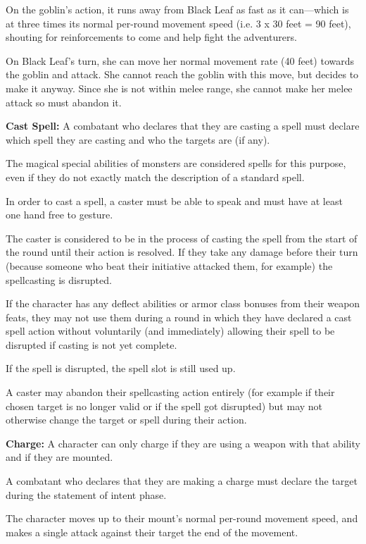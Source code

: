 \begin{multicols*}{2}
{On the goblin’s action, it runs away from Black Leaf as fast as it can—which is at three times its normal per-round movement speed (i.e. 3 x 30 feet = 90 feet), shouting for reinforcements to come and help fight the adventurers.

On Black Leaf’s turn, she can move her normal movement rate (40 feet) towards the goblin and attack. She cannot reach the goblin with this move, but decides to make it anyway. Since she is not within melee range, she cannot make her melee attack so must abandon it.}

\textbf{Cast Spell:} A combatant who declares that they are casting a spell must declare which spell they are casting and who the targets are (if any).

The magical special abilities of monsters are considered spells for this purpose, even if they do not exactly match the description of a standard spell.

In order to cast a spell, a caster must be able to speak and must have at least one hand free to gesture.

The caster is considered to be in the process of casting the spell from the start of the round until their action is resolved. If they take any damage before their turn (because someone who beat their initiative attacked them, for example) the spellcasting is disrupted.

If the character has any deflect abilities or armor class bonuses from their weapon feats, they may not use them during a round in which they have declared a cast spell action without voluntarily (and immediately) allowing their spell to be disrupted if casting is not yet complete.

If the spell is disrupted, the spell slot is still used up.

A caster may abandon their spellcasting action entirely (for example if their chosen target is no longer valid or if the spell got disrupted) but may not otherwise change the target or spell during their action.

\textbf{Charge:}\label{sec:Charge} A character can only charge if they are using a weapon with that ability and if they are mounted.

A combatant who declares that they are making a charge must declare the target during the statement of intent phase.

The character moves up to their mount’s normal per-round movement speed, and makes a single attack against their target the end of the movement.


\end{multicols*}
